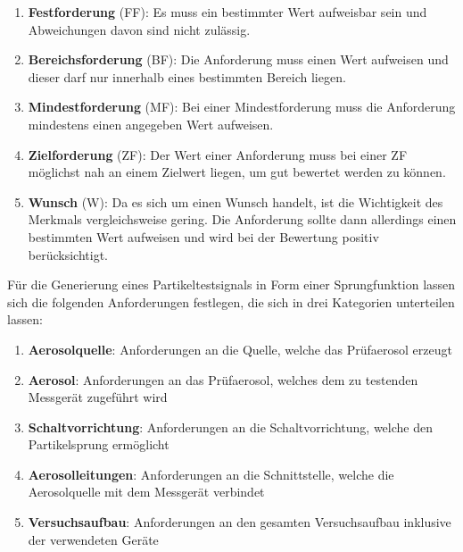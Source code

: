 \begin{enumerate}
	\item \textbf{Festforderung} (FF): Es muss ein bestimmter Wert aufweisbar sein und Abweichungen davon sind nicht zul\"{a}ssig.
	
	\item \textbf{Bereichsforderung} (BF): Die Anforderung muss einen Wert aufweisen und dieser darf nur innerhalb eines bestimmten Bereich liegen.
	
	\item \textbf{Mindestforderung} (MF): Bei einer Mindestforderung muss die Anforderung mindestens einen angegeben Wert aufweisen.
	
	\item \textbf{Zielforderung} (ZF): Der Wert einer Anforderung muss bei einer ZF m\"{o}glichst nah an einem Zielwert liegen, um gut bewertet werden zu k\"{o}nnen.
	
	\item \textbf{Wunsch} (W): Da es sich um einen Wunsch handelt, ist die Wichtigkeit des Merkmals vergleichsweise gering. Die Anforderung sollte dann allerdings einen bestimmten Wert aufweisen und wird bei der Bewertung positiv ber\"{u}cksichtigt. 
\end{enumerate}
F\"{u}r die Generierung eines Partikeltestsignals in Form einer Sprungfunktion lassen sich die folgenden Anforderungen festlegen, die sich in drei Kategorien unterteilen lassen:
\begin{enumerate}
	\item \textbf{Aerosolquelle}: Anforderungen an die Quelle, welche das Pr\"{u}faerosol erzeugt
	\item \textbf{Aerosol}: Anforderungen an das Pr\"{u}faerosol, welches dem zu testenden Messger\"{a}t zugef\"{u}hrt wird
	\item \textbf{Schaltvorrichtung}: Anforderungen an die Schaltvorrichtung, welche den Partikelsprung erm\"{o}glicht 
	\item \textbf{Aerosolleitungen}: Anforderungen an die Schnittstelle, welche die Aerosolquelle mit dem Messger\"{a}t verbindet
	\item \textbf{Versuchsaufbau}: Anforderungen an den gesamten Versuchsaufbau inklusive der verwendeten Ger\"{a}te
\end{enumerate}
